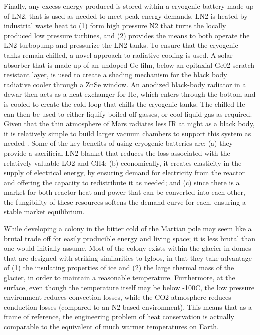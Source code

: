 \documentclass[fleqn,10pt]{Stylesheet} %
\begin{document}
Finally, any excess energy produced is stored within a cryogenic battery \cite{Hogberg2018} made up of LN2, that is used as needed to meet peak energy demands. LN2 is heated by industrial waste heat to (1) form high pressure N2 that turns the locally produced low pressure turbines, and (2) provides the means to both operate the LN2 turbopump and pressurize the LN2 tanks. To ensure that the cryogenic tanks remain chilled, a novel approach to radiative cooling is used. A solar absorber that is made up of an undoped Ge film, below an epitaxial Ge02 scratch resistant layer, is used to create a shading mechanism for the black body radiative cooler through a ZnSe window. An anodized black-body radiator in a dewar then acts as a heat exchanger for He, which enters through the bottom and is cooled to create the cold loop that chills the cryogenic tanks. The chilled He can then be used to either liquify boiled off gasses, or cool liquid gas as required. Given that the thin atmosphere of Mars radiates less IR at night as a black body, it is relatively simple to build larger vacuum chambers to support this system as needed \cite{Chen2019}. Some of the key benefits of using cryogenic batteries are: (a) they provide a sacrificial LN2 blanket that reduces the loss associated with the relatively valuable LO2 and CH4; (b) economically, it creates elasticity in the supply of electrical energy, by ensuring demand for electricity from the reactor and offering the capacity to redistribute it as needed; and (c) since there is a market for both reactor heat and power that can be converted into each other, the fungibility of these resources softens the demand curve for each, ensuring a stable market equilibrium.

While developing a colony in the bitter cold of the Martian pole may seem like a brutal trade off for easily producible energy and living space; it is less brutal than one would initially assume. Most of the colony exists within the glacier in domes that are designed with striking similarities to Igloos, in that they take advantage of (1) the insulating properties of ice and (2) the large thermal mass of the glacier, in order to maintain a reasonable temperature. Furthermore, at the surface, even though the temperature itself may be below -100\degree{}C, the low pressure environment reduces convection losses, while the CO2 atmosphere reduces conduction losses (compared to an N2-based environment). This means that as a frame of reference, the engineering problem of heat conservation is actually comparable to the equivalent of much warmer temperatures on Earth.
\end{document}
